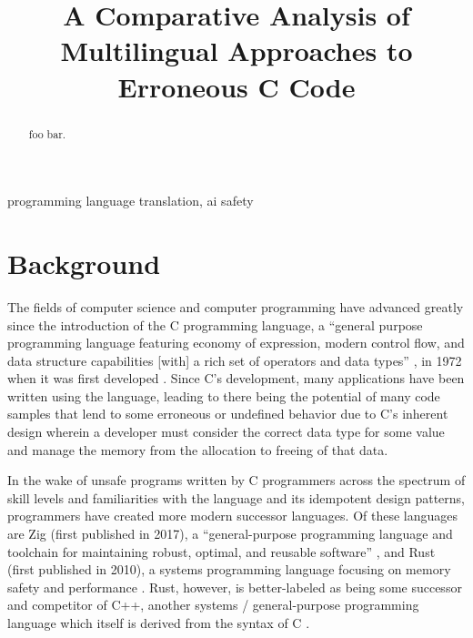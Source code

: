 \documentclass[conference]{IEEEtran}
\begin{document}
\title{A Comparative Analysis of Multilingual Approaches to Erroneous C Code}

\author{
}

\maketitle

\begin{abstract}
foo bar.
\end{abstract}

\begin{IEEEkeywords}
programming language translation, ai safety
\end{IEEEkeywords}

\section{Background}
The fields of computer science and computer programming have advanced greatly
since the introduction of the C programming language, a ``general purpose
programming language featuring economy of expression, modern control flow, and
data structure capabilities [with] a rich set of operators and data types''
\cite{ritchie1978c}, in 1972 when it was first developed
\cite{tyagi2014tribute}. Since C's development, many applications have been
written using the language, leading to there being the potential of many code
samples that lend to some erroneous or undefined behavior due to C's inherent
design wherein a developer must consider the correct data type for some value
and manage the memory from the allocation to freeing of that data.

In the wake of unsafe programs written by C programmers across the spectrum of
skill levels and familiarities with the language and its idempotent design
patterns, programmers have created more modern successor languages. Of these
languages are Zig (first published in 2017), a ``general-purpose programming
language and toolchain for maintaining robust, optimal, and reusable software''
\cite{zigGithubRepo}, and Rust (first published in 2010), a systems programming
language focusing on memory safety and performance \cite{bugden2022rust}. Rust,
however, is better-labeled as being some successor and competitor of C++,
another systems / general-purpose programming language which itself is derived
from the syntax of C \cite{bugden2022rust}.
\end{document}
